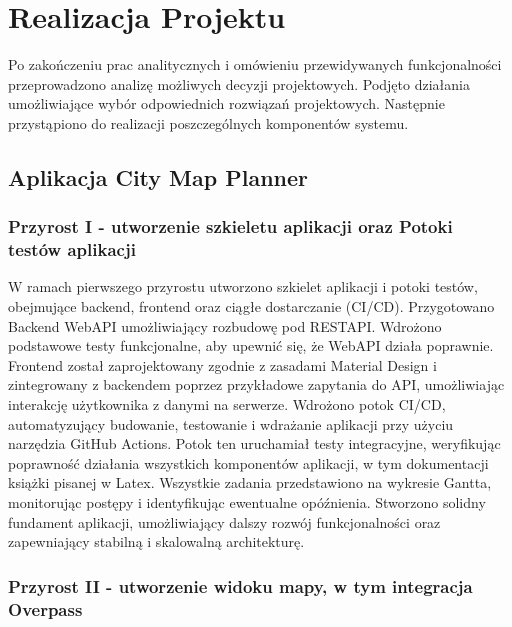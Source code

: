 
\chapter{Realizacja Projektu}
\label{ch:realizacja}
Po zakończeniu prac analitycznych i omówieniu przewidywanych funkcjonalności przeprowadzono analizę możliwych decyzji projektowych. Podjęto działania umożliwiające wybór odpowiednich rozwiązań projektowych. 
Następnie przystąpiono do realizacji poszczególnych komponentów systemu.

\section{Aplikacja City Map Planner}
\label{sec:aplikacja}

\subsection{Przyrost I - utworzenie szkieletu aplikacji oraz Potoki testów aplikacji}
\label{sec:przyrost1}

W ramach pierwszego przyrostu utworzono szkielet aplikacji i potoki testów, obejmujące backend, frontend oraz ciągłe dostarczanie (CI/CD). \newline
\indent Przygotowano Backend WebAPI umożliwiający rozbudowę pod RESTAPI. Wdrożono podstawowe testy funkcjonalne, aby upewnić się, że WebAPI działa poprawnie.\newline
\indent Frontend został zaprojektowany zgodnie z zasadami Material Design i zintegrowany z backendem poprzez przykładowe zapytania do API, umożliwiając interakcję użytkownika z danymi na serwerze. \newline
\indent Wdrożono potok CI/CD, automatyzujący budowanie, testowanie i wdrażanie aplikacji przy użyciu narzędzia GitHub Actions. Potok ten uruchamiał testy integracyjne, weryfikując poprawność działania wszystkich komponentów aplikacji, w tym dokumentacji książki pisanej w Latex. \newline
\indent Wszystkie zadania przedstawiono na wykresie Gantta, monitorując postępy i identyfikując ewentualne opóźnienia. Stworzono solidny fundament aplikacji, umożliwiający dalszy rozwój funkcjonalności oraz zapewniający stabilną i skalowalną architekturę. \newline

\subsection{Przyrost II - utworzenie widoku mapy, w tym integracja  Overpass}
    \label{sec:przyrost2}

